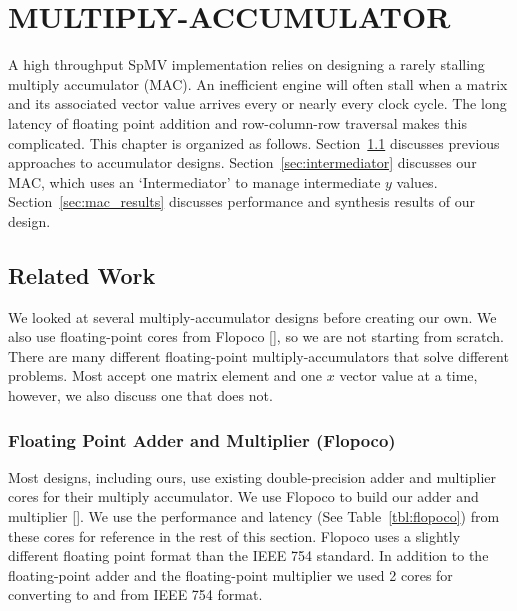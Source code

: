 \chapter{MULTIPLY-ACCUMULATOR}
\label{chp:mac}
A high throughput SpMV implementation relies on designing a rarely stalling multiply accumulator (MAC). An inefficient engine will often stall when a matrix and its associated vector value arrives every or nearly every clock cycle. The long latency of floating point addition and row-column-row traversal makes this complicated. This chapter is organized as follows. Section~\ref{sec:mac_related_work} discusses previous approaches to accumulator designs. Section~\ref{sec:intermediator} discusses our MAC, which uses an `Intermediator' to manage intermediate $y$ values. Section~\ref{sec:mac_results} discusses performance and synthesis results of our design.

\section{Related Work}
\label{sec:mac_related_work}
We looked at several multiply-accumulator designs before creating our own. We also use floating-point cores from Flopoco [\cite{prelim:dedinechin}], so we are not starting from scratch. There are many different floating-point multiply-accumulators that solve different problems. Most accept one matrix element and one $x$ vector value at a time, however, we also discuss one that does not.
\subsection{Floating Point Adder and Multiplier (Flopoco)}
Most designs, including ours, use existing double-precision adder and multiplier cores for their multiply accumulator. We use Flopoco to build our adder and multiplier [\cite{prelim:banescu,prelim:dedinechin2}]. We use the performance and latency (See Table~\ref{tbl:flopoco}) from these cores for reference in the rest of this section.  Flopoco uses a slightly different floating point format than the IEEE 754 standard. In addition to the floating-point adder and the floating-point multiplier we used 2 cores for converting to and from IEEE 754 format.

